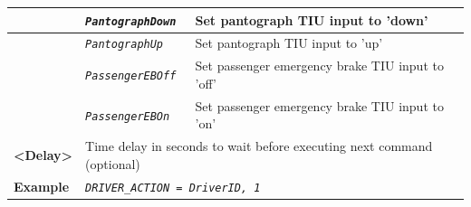 \documentclass{template/openetcs}
\begin{document}
\begin{itemize}
\begin{longtable}{|l|l|l|}
			\hline
			
			&	\begin{minipage}[t]{0.40\linewidth} \emph{\texttt{PantographDown}} \end{minipage}
			&	\begin{minipage}[t]{0.38\linewidth} Set pantograph TIU input to ’down’ \end{minipage} \\
			
			\hline
			
			&	\begin{minipage}[t]{0.40\linewidth} \emph{\texttt{PantographUp}} \end{minipage}
			&	\begin{minipage}[t]{0.38\linewidth} Set pantograph TIU input to ’up’ \end{minipage} \\
			
			\hline
			
			&	\begin{minipage}[t]{0.40\linewidth} \emph{\texttt{PassengerEBOff}} \end{minipage}
			&	\begin{minipage}[t]{0.38\linewidth} Set passenger emergency brake TIU input to ’off’ \end{minipage} \\
			
			\hline
			
			&	\begin{minipage}[t]{0.40\linewidth} \emph{\texttt{PassengerEBOn}} \end{minipage}
			&	\begin{minipage}[t]{0.38\linewidth} Set passenger emergency brake TIU input to ’on’ \end{minipage} \\
			
			\hline
			
				\begin{minipage}[t]{0.22\linewidth} \textbf{<Delay>} \end{minipage}
			&	\multicolumn{2}{l|}{ \begin{minipage}[t]{0.78\linewidth} Time delay in seconds to wait before executing next command (optional) \end{minipage} } \\
			
			\hline
			
				\begin{minipage}[t]{0.22\linewidth} \textbf{Example} \end{minipage}
			&	\multicolumn{2}{l|}{ \begin{minipage}[t]{0.78\linewidth} \emph{\texttt{DRIVER\_ACTION = DriverID, 1}} \end{minipage} } \\
			

\end{longtable}
\end{itemize}
\end{document}
